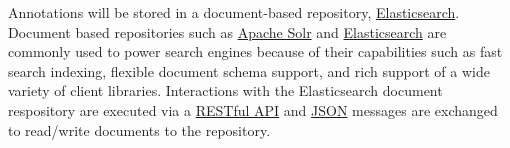 Annotations will be stored in a document-based repository, \hyperref[glossary:elasticsearch]{Elasticsearch}.  Document based repositories such as \hyperref[glossary:apache-solr]{Apache Solr} and \hyperref[glossary:elasticsearch]{Elasticsearch} are commonly used to power search engines because of their capabilities such as fast search indexing, flexible document schema support, and rich support of a wide variety of client libraries.  Interactions with the Elasticsearch document respository are executed via a \hyperref[glossary:restful-api]{RESTful API} and \hyperref[glossary:json]{JSON} messages are exchanged to read/write documents to the repository.


